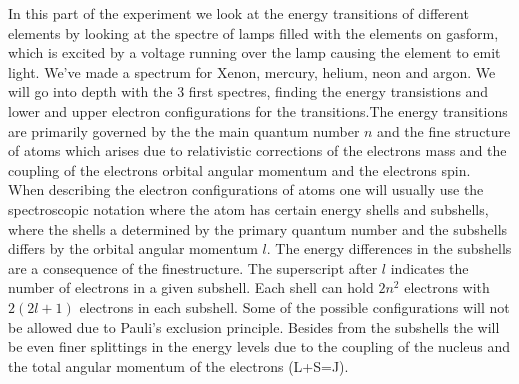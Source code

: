 In this part of the experiment we look at the energy transitions of different elements by looking at the spectre of lamps filled with the elements on gasform, which is excited by a voltage running over the lamp causing the element to emit light. We've made a spectrum for Xenon, mercury, helium, neon and argon. We will go into depth with the 3 first spectres, finding the energy transistions and lower and upper  electron configurations for the transitions.The energy transitions are primarily governed by the the main quantum number $n$ and the fine structure of atoms which arises due to relativistic corrections of the electrons mass and the coupling of the electrons orbital angular momentum and the electrons spin.\\
 When describing the electron configurations of atoms one will usually use the spectroscopic notation where the atom has certain energy shells and subshells, where the shells a determined by the primary quantum number and the subshells differs by the orbital angular momentum $l$. The energy differences in the subshells are a consequence of the finestructure. The superscript after $l$ indicates the number of electrons in a given subshell. Each shell can hold $2n^2$ electrons with $2(2l+1)$ electrons in each subshell. Some of the possible configurations will not be allowed due to Pauli's exclusion principle. Besides from the subshells the will be even finer splittings in the energy levels due to the coupling of the nucleus and the total angular momentum of the electrons (L+S=J). 
 

